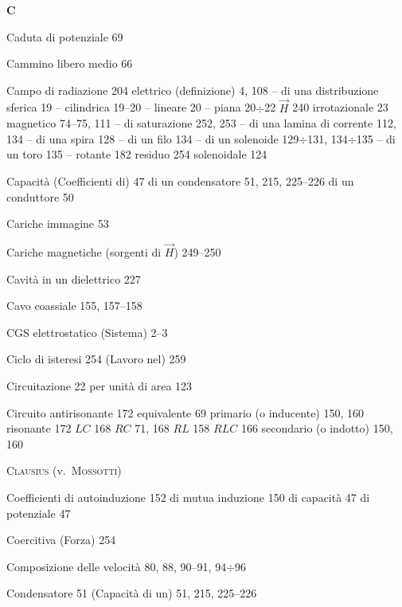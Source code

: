 \begin{theindex}
  \indexspace
  \item \textbf{C}
  \indexspace
  \item Caduta di potenziale 69
  \item Cammino libero medio 66
  \item Campo
    \subitem di radiazione 204
    \subitem elettrico (definizione) 4, 108
    \subitem -- di una distribuzione sferica 19
    \subitem -- cilindrica 19--20
    \subitem -- lineare 20
    \subitem -- piana 20$\div$22
    \subitem $\vec H$ 240
    \subitem irrotazionale 23
    \subitem magnetico 74--75, 111
    \subitem -- di saturazione 252, 253
    \subitem -- di una lamina di corrente 112, 134
    \subitem -- di una spira 128
    \subitem -- di un filo 134
    \subitem -- di un solenoide 129$\div$131, 134$\div$135
    \subitem -- di un toro 135
    \subitem -- rotante 182
    \subitem residuo 254
    \subitem solenoidale 124
  \item Capacit\`a
    \subitem (Coefficienti di) 47
    \subitem di un condensatore 51, 215, 225--226
    \subitem di un conduttore 50
  \item Cariche immagine 53
  \item Cariche magnetiche (sorgenti di $\vec H$) 249--250
  \item Cavit\`a in un dielettrico 227
  \item Cavo coassiale 155, 157--158
  \item CGS elettrostatico (Sistema) 2--3
  \item Ciclo di isteresi 254
    \subitem (Lavoro nel) 259
  \item Circuitazione 22
    \subitem per unit\`a di area 123
  \item Circuito
    \subitem antirisonante 172
    \subitem equivalente 69
    \subitem primario (o inducente) 150, 160
    \subitem risonante 172
    \subitem $LC$ 168
    \subitem $RC$ 71, 168
    \subitem $RL$ 158
    \subitem $RLC$ 166
    \subitem secondario (o indotto) 150, 160
  \item \textsc{Clausius} (v.\ \textsc{Mossotti})
  \item Coefficienti
    \subitem di autoinduzione 152
    \subitem di mutua induzione 150
    \subitem di capacit\`a 47
    \subitem di potenziale 47
  \item Coercitiva (Forza) 254
  \item Composizione delle velocit\`a 80, 88, 90--91, 94$\div$96
  \item Condensatore 51
    \subitem (Capacit\`a di un) 51, 215, 225--226

\end{theindex}
